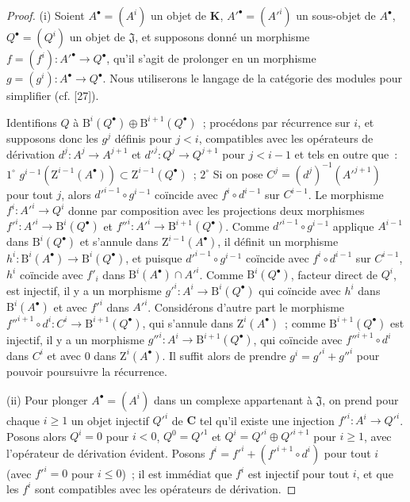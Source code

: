 \begin{proof}
\textup{(i)} Soient $A^\bullet=(A^i)$ un objet de $\boldsymbol{K}$,
$A'^\bullet=(A'^i)$ un sous-objet de $A^\bullet$,
$Q^\bullet=(Q^i)$ un objet de $\mathfrak J$, et supposons donné un morphisme
$f=(f^i):A'^\bullet\to Q^\bullet$, qu'il s'agit de prolonger en un morphisme
$g=(g^i):A^\bullet\to Q^\bullet$. Nous utiliserons le langage de la catégorie
des modules pour simplifier (cf. [27]).

Identifions $Q$ à
$\mathrm B^i(Q^\bullet)\oplus\mathrm B^{i+1}(Q^\bullet)$~; procédons par
récurrence sur $i$, et supposons donc les $g^j$ définis pour $j<i$,
compatibles avec les opérateurs de dérivation $d^j:A^j\to A^{j+1}$ et
$d'^j:Q^j\to Q^{j+1}$ pour $j<i-1$ et tels en outre que~: $1^\circ$ $g^{i-1}(\mathrm Z^{i-1}(A^\bullet))\subset
\mathrm Z^{i-1}(Q^\bullet)$~; $2^\circ$ Si on pose $C^j=(d^j)^{-1}(A'^{j+1})$ pour tout $j$, alors
$d'^{i-1}\circ g^{i-1}$ coïncide avec $f^i\circ d^{i-1}$ sur $C^{i-1}$.
Le morphisme $f^i:A'^i\to Q^i$ donne par composition avec les projections
deux morphismes
$f'^i:A'^i\to\mathrm B^i(Q^\bullet)$ et
$f''^i:A'^i\to\mathrm B^{i+1}(Q^\bullet)$. Comme
$d'^{i-1}\circ g^{i-1}$ applique $A^{i-1}$ dans
$\mathrm B^i(Q^\bullet)$ et s'annule dans $\mathrm Z^{i-1}(A^\bullet)$, il
définit un morphisme
$h^i:\mathrm B^i(A^\bullet)\to\mathrm B^i(Q^\bullet)$, et puisque
$d'^{i-1}\circ g^{i-1}$ coïncide avec $f^i\circ d^{i-1}$ sur $C^{i-1}$,
$h^i$ coïncide avec $f'_i$ dans
$\mathrm B^i(A^\bullet)\cap A'^i$. Comme $\mathrm B^i(Q^\bullet)$, facteur
direct de $Q^i$, est injectif, il y a un morphisme
$g'^i:A^i\to\mathrm B^i(Q^\bullet)$ qui coïncide avec $h^i$ dans
$\mathrm B^i(A^\bullet)$ et avec $f'^i$ dans $A'^i$. Considérons d'autre part
le morphisme
$f''^{i+1}\circ d^i:C^i\to\mathrm B^{i+1}(Q^\bullet)$, qui s'annule dans
$\mathrm Z^i(A^\bullet)$~; comme $\mathrm B^{i+1}(Q^\bullet)$ est injectif,
il y a un morphisme $g''^i:A^i\to\mathrm B^{i+1}(Q^\bullet)$, qui coïncide
avec $f''^{i+1}\circ d^i$ dans $C^i$ et avec $0$ dans
$\mathrm Z^i(A^\bullet)$. Il suffit alors de prendre $g^i=g'^i+g''^i$ pour
pouvoir poursuivre la récurrence.

\textup{(ii)} Pour plonger $A^\bullet=(A^i)$ dans un complexe appartenant à
$\mathfrak J$, on prend pour chaque $i\geq1$ un objet injectif $Q'^i$ de
$\boldsymbol{C}$ tel qu'il existe une injection $f'^i:A^i\to Q'^i$. Posons alors
$Q^i=0$ pour $i<0$, $Q^0=Q'^1$ et $Q^i=Q'^i\oplus Q'^{i+1}$ pour $i\geq1$,
avec l'opérateur de dérivation évident. Posons
$f^i=f'^i+(f'^{i+1}\circ d^i)$ pour tout $i$ (avec $f'^i=0$ pour $i\leq0$)~;
il est immédiat que $f^i$ est injectif pour tout $i$, et que les $f^i$ sont
compatibles avec les opérateurs de dérivation.
\end{proof}

